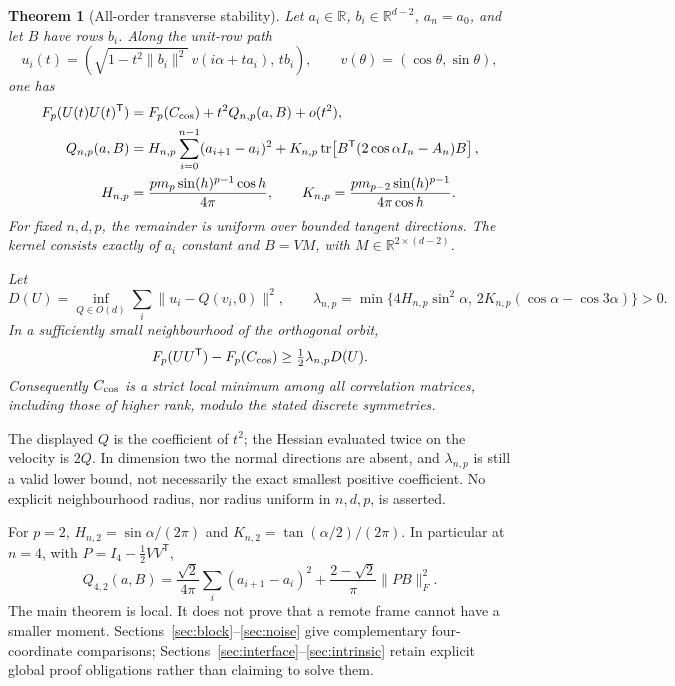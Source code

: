 \documentclass[11pt,a4paper]{article}
\newtheorem{theorem}{Theorem}[section]
\theoremstyle{remark}\newtheorem{remark}[theorem]{Remark}
\newcommand{\R}{\mathbb R}
\newcommand{\tr}{\operatorname{tr}}
\begin{document}
\begin{theorem}[All-order transverse stability]\label{thm:main}
Let $a_i\in\R$, $b_i\in\R^{d-2}$, $a_n=a_0$, and let $B$ have rows $b_i$. Along the unit-row path
\begin{equation}\label{eq:path}
 u_i(t)=\left(\sqrt{1-t^2\|b_i\|^2}\,v(i\alpha+ta_i),\,tb_i\right),
 \qquad v(\theta)=(\cos\theta,\sin\theta),
\end{equation}
one has
\begin{align}
 F_p(U(t)U(t)^{\mathsf T})
 &= F_p(C_{\rm cos})+t^2 Q_{n,p}(a,B)+o(t^2),\label{eq:main}\\
 Q_{n,p}(a,B)
 &=H_{n,p}\sum_{i=0}^{n-1}(a_{i+1}-a_i)^2
 +K_{n,p}\tr\!\left[B^{\mathsf T}(2\cos\alpha I_n-A_n)B\right],\label{eq:Q}\\
 H_{n,p}&=\frac{p m_p\sin(h)^{p-1}\cos h}{4\pi},\qquad
 K_{n,p}=\frac{p m_{p-2}\sin(h)^{p-1}}{4\pi\cos h}.\label{eq:HK}
\end{align}
For fixed $n,d,p$, the remainder is uniform over bounded tangent directions. The kernel consists exactly of $a_i$ constant and $B=VM$, with $M\in\R^{2\times(d-2)}$.

Let
\[
 D(U)=\inf_{Q\in O(d)}\sum_i\|u_i-Q(v_i,0)\|^2,\qquad
 \lambda_{n,p}=\min\{4H_{n,p}\sin^2\alpha,\,
            2K_{n,p}(\cos\alpha-\cos3\alpha)\}>0.
\]
In a sufficiently small neighbourhood of the orthogonal orbit,
\begin{equation}\label{eq:growth}
 F_p(UU^{\mathsf T})-F_p(C_{\rm cos})
 \ge \tfrac12\lambda_{n,p}D(U).
\end{equation}
Consequently $C_{\rm cos}$ is a strict local minimum among all correlation matrices, including those of higher rank, modulo the stated discrete symmetries.
\end{theorem}

The displayed $Q$ is the coefficient of $t^2$; the Hessian evaluated twice on the velocity is $2Q$. In dimension two the normal directions are absent, and $\lambda_{n,p}$ is still a valid lower bound, not necessarily the exact smallest positive coefficient. No explicit neighbourhood radius, nor radius uniform in $n,d,p$, is asserted.

For $p=2$, $H_{n,2}=\sin\alpha/(2\pi)$ and $K_{n,2}=\tan(\alpha/2)/(2\pi)$. In particular at $n=4$, with $P=I_4-\tfrac12VV^{\mathsf T}$,
\begin{equation}\label{eq:four}
 Q_{4,2}(a,B)=\frac{\sqrt2}{4\pi}\sum_i(a_{i+1}-a_i)^2
       +\frac{2-\sqrt2}{\pi}\|PB\|_F^2.
\end{equation}
The main theorem is local. It does not prove that a remote frame cannot have a smaller moment. Sections~\ref{sec:block}--\ref{sec:noise} give complementary four-coordinate comparisons; Sections~\ref{sec:interface}--\ref{sec:intrinsic} retain explicit global proof obligations rather than claiming to solve them.
\end{document}

